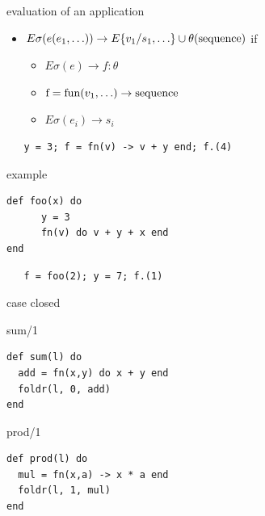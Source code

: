 \begin{frame}[fragile]{evaluation of an application}

  \begin{itemize}
   \pause\item $E\sigma(e(e_1, \ldots)) \rightarrow E\{v_1/s_1, \ldots\}\cup\theta({\rm sequence} )$ if
    \begin{itemize}        
           \pause\item $E\sigma(e) \rightarrow f:\theta$
           \pause\item ${\rm f} = {\rm fun}(v_1, \ldots) \rightarrow  {\rm sequence}$ 
           \pause\item $E\sigma(e_i) \rightarrow s_i$ 
    \end{itemize} 
  \end{itemize}

\pause\vspace{20pt}

\begin{verbatim}
   y = 3; f = fn(v) -> v + y end; f.(4)
\end{verbatim}

\end{frame}
 
\begin{frame}[fragile]{example}

\begin{verbatim}
def foo(x) do
      y = 3
      fn(v) do v + y + x end
end
\end{verbatim}
\pause\vspace{20pt}

\begin{verbatim}
   f = foo(2); y = 7; f.(1)
\end{verbatim}
\end{frame}

\begin{frame}[fragile]{case closed}

\pause
     \begin{block}{sum/1}
       \begin{verbatim}
def sum(l) do
  add = fn(x,y) do x + y end
  foldr(l, 0, add)
end
       \end{verbatim}
     \end{block}
   \pause
     \begin{block}{prod/1}
       \begin{verbatim}
def prod(l) do 
  mul = fn(x,a) -> x * a end
  foldr(l, 1, mul)
end
       \end{verbatim}
\vfill
     \end{block}

\end{frame}

